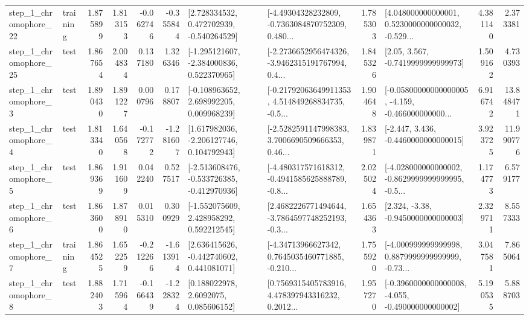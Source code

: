 \begin{tabular}{llrrrrllrlrr}
    step\_1\_chromophore\_22 &  training &      1.875899 &    1.813153 &     -0.062746 & -0.355844 &    [2.728334532, 0.472702939, -0.540264529] &  [-4.49304328232809, -0.7363084870752309, 0.480... &       1.785303 &  [4.048000000000001, 0.5230000000000032, -0.529... &            4.381140 &          2.373381 \\
    step\_1\_chromophore\_25 &      test &      1.867654 &    2.004834 &      0.137180 &  1.326346 &   [-1.295121607, -2.384000836, 0.522370965] &  [-2.2736652956474326, -3.9462315191767994, 0.4... &       1.845326 &                 [2.05, 3.567, -0.7419999999999973] &            1.509162 &          4.730393 \\
     step\_1\_chromophore\_3 &      test &      1.890430 &    1.891227 &      0.000796 &  0.178807 &    [-0.108963652, 2.698992205, 0.009968239] &  [-0.21792063649911353, 4.514849268834735, -0.5... &       1.904648 &  [-0.05800000000000005, -4.159, -0.466000000000... &            6.916742 &         13.848471 \\
     step\_1\_chromophore\_4 &      test &      1.813340 &    1.640568 &     -0.172772 & -1.281607 &    [1.617982036, -2.206127746, 0.104792943] &  [-2.5282591147998383, 3.7006690509666353, 0.46... &       1.839871 &               [-2.447, 3.436, -0.4460000000000015] &            3.923725 &         11.990776 \\
     step\_1\_chromophore\_5 &      test &      1.869369 &    1.911609 &      0.042240 &  0.527517 &  [-2.513608476, -0.533726385, -0.412970936] &  [-4.480317571618312, -0.4941585625888789, -0.8... &       2.025024 &  [-4.028000000000002, -0.8629999999999995, -0.5... &            1.174773 &          6.579177 \\
     step\_1\_chromophore\_6 &      test &      1.863600 &    1.878910 &      0.015310 &  0.300929 &    [-1.552075609, 2.428958292, 0.592212545] &  [2.4682226771494644, -3.7864597748252193, -0.3... &       1.654363 &                [2.324, -3.38, -0.9450000000000003] &            2.329711 &          8.557333 \\
     step\_1\_chromophore\_7 &  training &      1.864525 &    1.652259 &     -0.212266 & -1.613914 &    [2.636415626, -0.442740602, 0.441081071] &  [-4.34713966627342, 0.7645035460771885, -0.210... &       1.755920 &  [-4.000999999999998, 0.8879999999999999, -0.73... &            3.047581 &          7.865064 \\
     step\_1\_chromophore\_8 &      test &      1.882403 &    1.715964 &     -0.166439 & -1.228324 &       [0.188022978, 2.6092075, 0.085606152] &  [0.7569315405783916, 4.478397943316232, 0.2012... &       1.957270 &  [-0.3960000000000008, -4.055, -0.490000000000002] &            5.190535 &          5.888703 \\

\end{tabular}
